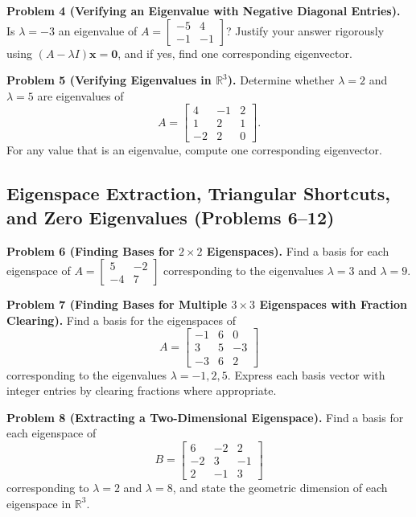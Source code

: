 \documentclass[11pt, letterpaper]{article}
\theoremstyle{definition}
\theoremstyle{remark}
\begin{document}
\textbf{Problem 4 (Verifying an Eigenvalue with Negative Diagonal Entries).}
Is $\lambda = -3$ an eigenvalue of $A = \begin{bmatrix} -5 & 4 \\ -1 & -1 \end{bmatrix}$? Justify your answer rigorously using $(A - \lambda I)\mathbf{x} = \mathbf{0}$, and if yes, find one corresponding eigenvector.

\textbf{Problem 5 (Verifying Eigenvalues in $\mathbb{R}^3$).}
Determine whether $\lambda = 2$ and $\lambda = 5$ are eigenvalues of
\[
A = \begin{bmatrix} 4 & -1 & 2 \\ 1 & 2 & 1 \\ -2 & 2 & 0 \end{bmatrix}.
\]
For any value that is an eigenvalue, compute one corresponding eigenvector.

\subsection{Eigenspace Extraction, Triangular Shortcuts, and Zero Eigenvalues (Problems 6--12)}

\textbf{Problem 6 (Finding Bases for $2\times 2$ Eigenspaces).}
Find a basis for each eigenspace of $A = \begin{bmatrix} 5 & -2 \\ -4 & 7 \end{bmatrix}$ corresponding to the eigenvalues $\lambda = 3$ and $\lambda = 9$.

\textbf{Problem 7 (Finding Bases for Multiple $3\times 3$ Eigenspaces with Fraction Clearing).}
Find a basis for the eigenspaces of
\[
A = \begin{bmatrix} -1 & 6 & 0 \\ 3 & 5 & -3 \\ -3 & 6 & 2 \end{bmatrix}
\]
corresponding to the eigenvalues $\lambda = -1, 2, 5$. Express each basis vector with integer entries by clearing fractions where appropriate.

\textbf{Problem 8 (Extracting a Two-Dimensional Eigenspace).}
Find a basis for each eigenspace of
\[
B = \begin{bmatrix} 6 & -2 & 2 \\ -2 & 3 & -1 \\ 2 & -1 & 3 \end{bmatrix}
\]
corresponding to $\lambda = 2$ and $\lambda = 8$, and state the geometric dimension of each eigenspace in $\mathbb{R}^3$.
\end{document}
